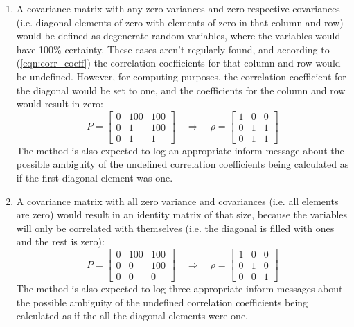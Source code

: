 \documentclass[11pt,fleqn]{report}
\begin{document}
\begin{enumerate}
{}
\item{
A covariance matrix with any zero variances and zero respective covariances 
(i.e. diagonal elements of zero with elements of zero in that column and row) would be
defined as degenerate random variables, where the variables would have 100\% certainty.
These cases aren't regularly found, and according to (\ref{eqn:corr_coeff}) the 
correlation coefficients for that column and row would be undefined. However, for
computing purposes, the correlation coefficient for the diagonal would be set to one, and the
coefficients for the column and row would result in zero:
\begin{equation*}
P = 
\begin{bmatrix}
0 & 100 & 100 \\
0 & 1 & 100 \\
0 & 1 & 1
\end{bmatrix} \quad \Longrightarrow \quad
\rho = 
\begin{bmatrix}
1 & 0 & 0 \\
0 & 1 & 1 \\
0 & 1 & 1
\end{bmatrix}
\end{equation*}
The method is also expected to log an appropriate inform message about the possible
ambiguity of the undefined correlation coefficients being calculated as if the 
first diagonal element was one.
}
\item{
A covariance matrix with all zero variance and covariances (i.e. all elements are zero)
would result in an identity matrix of that size, because the variables will only be 
correlated with themselves (i.e. the diagonal is filled with ones and the rest is zero):
\begin{equation*}
P = 
\begin{bmatrix}
0 & 100 & 100 \\
0 & 0 & 100 \\
0 & 0 & 0
\end{bmatrix} \quad \Longrightarrow \quad
\rho = 
\begin{bmatrix}
1 & 0 & 0 \\
0 & 1 & 0 \\
0 & 0 & 1
\end{bmatrix}
\end{equation*}
The method is also expected to log three appropriate inform messages about the possible
ambiguity of the undefined correlation coefficients being calculated as if the 
all the diagonal elements were one.
}
\end{enumerate}
\end{document}
